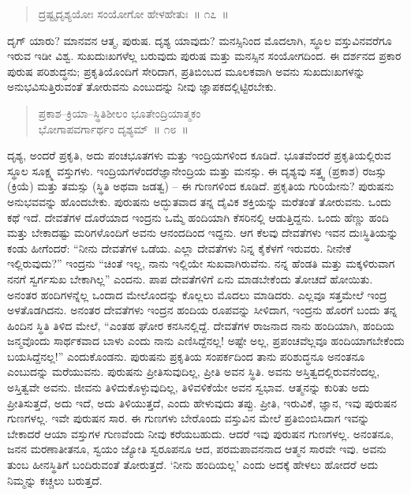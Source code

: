 \begin{verse}
ದ್ರಷ್ಟೃದೃಶ್ಯಯೋಃ ಸಂಯೋಗೋ ಹೇಳಹೇತುಃ~॥ ೧೭~॥
\end{verse}

\vspace{-0.4cm}


\vskip 0.2cm

ದೃಗ್​ ಯಾರು? ಮಾನವನ ಆತ್ಮ, ಪುರುಷ. ದೃಶ್ಯ ಯಾವುದು? ಮನಸ್ಸಿನಿಂದ ಮೊದಲಾಗಿ, ಸ್ಥೂಲ ವಸ್ತುವಿನವರೆಗೂ ಇರುವ ಇಡೀ ವಿಶ್ವ. ಸುಖದುಃಖಗಳೆಲ್ಲ ಬರುವುದು ಪುರುಷ ಮತ್ತು ಮನಸ್ಸಿನ ಸಂಯೋಗದಿಂದ. ಈ ದರ್ಶನದ ಪ್ರಕಾರ ಪುರುಷ ಪರಿಶುದ್ಧನು; ಪ್ರಕೃತಿಯೊಂದಿಗೆ ಸೇರಿದಾಗ, ಪ್ರತಿಬಿಂಬದ ಮೂಲಕವಾಗಿ ಅವನು ಸುಖದುಃಖಗಳನ್ನು ಅನುಭವಿಸುತ್ತಿರುವಂತೆ ತೋರುವನು ಎಂಬುದನ್ನು ನೀವು ಜ್ಞಾಪಕದಲ್ಲಿಟ್ಟಿರಬೇಕು. 

\vspace{-0.2cm}

\begin{verse}
ಪ್ರಕಾಶ–ಕ್ರಿಯಾ–ಸ್ಥಿತಿಶೀಲಂ ಭೂತೇಂದ್ರಿಯಾತ್ಮಕಂ\\ ಭೋಗಾಪವರ್ಗಾರ್ಥಂ ದೃಶ್ಯಮ್​~॥ ೧೮~॥
\end{verse}

\vspace{-0.4cm}


\vskip 0.2cm

ದೃಶ್ಯ, ಅಂದರೆ ಪ್ರಕೃತಿ, ಅದು ಪಂಚಭೂತಗಳು ಮತ್ತು ಇಂದ್ರಿಯಗಳಿಂದ ಕೂಡಿದೆ. ಭೂತವೆಂದರೆ ಪ್ರಕೃತಿಯಲ್ಲಿರುವ ಸ್ಥೂಲ ಸೂಕ್ಷ್ಮ ವಸ್ತುಗಳು. ಇಂದ್ರಿಯಗಳೆಂದರೆ\break ಜ್ಞಾನೇಂದ್ರಿಯ ಮತ್ತು ಮನಸ್ಸು. ಈ ದೃಶ್ಯವು ಸತ್ತ್ವ (ಪ್ರಕಾಶ) ರಜಸ್ಸು (ಕ್ರಿಯೆ) ಮತ್ತು ತಮಸ್ಸು (ಸ್ಥಿತಿ ಅಥವಾ ಜಡತ್ವ) – ಈ ಗುಣಗಳಿಂದ ಕೂಡಿದೆ. ಪ್ರಕೃತಿಯ ಗುರಿಯೇನು? ಪುರುಷನು ಅನುಭವವನ್ನು ಹೊಂದಬೇಕು. ಪುರುಷನು ಅದ್ಭುತವಾದ ತನ್ನ ದೈವಿಕ ಶಕ್ತಿಯನ್ನು ಮರೆತಂತೆ ತೋರುವನು. ಒಂದು ಕಥೆ ಇದೆ. ದೇವತೆಗಳ ದೊರೆಯಾದ ಇಂದ್ರನು ಒಮ್ಮೆ ಹಂದಿಯಾಗಿ ಕೆಸರಿನಲ್ಲಿ ಆಡುತ್ತಿದ್ದನು. ಒಂದು ಹೆಣ್ಣು ಹಂದಿ ಮತ್ತು ಬೇಕಾದಷ್ಟು ಮರಿಗಳೊಂದಿಗೆ ಅವನು ಆನಂದದಿಂದ ಇದ್ದನು. ಆಗ ಕೆಲವು ದೇವತೆಗಳು ಇವನ ದುಃಸ್ಥಿತಿಯನ್ನು ಕಂಡು ಹೀಗೆಂದರೆ: “ನೀನು ದೇವತೆಗಳ ಒಡೆಯ. ಎಲ್ಲಾ ದೇವತೆಗಳು ನಿನ್ನ ಕೈಕೆಳಗೆ ಇರುವರು. ನೀನೇಕೆ ಇಲ್ಲಿರುವುದು?” ಇಂದ್ರನು “ಚಿಂತೆ ಇಲ್ಲ, ನಾನು ಇಲ್ಲಿಯೇ ಸುಖ\break ವಾಗಿರುವೆನು. ನನ್ನ ಹೆಂಡತಿ ಮತ್ತು ಮಕ್ಕಳಿರುವಾಗ ನನಗೆ ಸ್ವರ್ಗಸುಖ ಬೇಕಾಗಿಲ್ಲ” ಎಂದನು. ಪಾಪ ದೇವತೆಗಳಿಗೆ ಏನು ಮಾಡಬೇಕೆಂದು ತೋಚದೆ ಹೋಯಿತು. ಅನಂತರ ಹಂದಿಗಳನ್ನೆಲ್ಲ ಒಂದಾದ ಮೇಲೊಂದನ್ನು ಕೊಲ್ಲಲು ಮೊದಲು ಮಾಡಿದರು. ಎಲ್ಲವೂ ಸತ್ತಮೇಲೆ ಇಂದ್ರ ಅಳತೊಡಗಿದನು. ಅನಂತರ ದೇವತೆಗಳು ಇಂದ್ರನ ಹಂದಿಯ ರೂಪವನ್ನು ಸೀಳಿದಾಗ, ಇಂದ್ರನು ಹೊರಗೆ ಬಂದು ತನ್ನ ಹಿಂದಿನ ಸ್ಥಿತಿ ತಿಳಿದ ಮೇಲೆ, “ಎಂತಹ ಘೋರ ಕನಸಿನಲ್ಲಿದ್ದೆ. ದೇವತೆಗಳ ರಾಜನಾದ ನಾನು ಹಂದಿಯಾಗಿ, ಹಂದಿಯ ಜನ್ಮವೊಂದು ಸಾರ್ಥಕವಾದ ಬಾಳು ಎಂದು ನಾನು ಎಣಿಸಿದ್ದೆನಲ್ಲ! ಅಷ್ಟೇ ಅಲ್ಲ, ಪ್ರಪಂಚವೆಲ್ಲವೂ ಹಂದಿಯಾಗಬೇಕೆಂದು ಬಯಸಿದ್ದೆನಲ್ಲ!” ಎಂದುಕೊಂಡನು. ಪುರುಷನು ಪ್ರಕೃತಿಯ ಸಂಪರ್ಕದಿಂದ ತಾನು ಪರಿಶುದ್ಧನೂ ಅನಂತನೂ ಎಂಬುದನ್ನು ಮರೆಯುವನು. ಪುರುಷನು ಪ್ರೀತಿಸುವುದಿಲ್ಲ, ಪ್ರೀತಿ ಅವನ ಸ್ಥಿತಿ. ಅವನು ಅಸ್ತಿತ್ವದಲ್ಲಿರುವನೆಂದಲ್ಲ, ಅಸ್ತಿತ್ವವೇ ಅವನು. ಜೀವನು ತಿಳಿದುಕೊಳ್ಳುವುದಿಲ್ಲ, ತಿಳಿವಳಿಕೆಯೇ ಅವನ ಸ್ವಭಾವ. ಆತ್ಮನನ್ನು ಕುರಿತು ಅದು ಪ್ರೀತಿಸುತ್ತದೆ, ಅದು ಇದೆ, ಅದು ತಿಳಿಯುತ್ತದೆ, ಎಂದು ಹೇಳುವುದು ತಪ್ಪು. ಪ್ರೀತಿ, ಇರುವಿಕೆ, ಜ್ಞಾನ, ಇವು ಪುರುಷನ ಗುಣಗಳಲ್ಲ. ಇವೇ ಪುರುಷನ ಸಾರ. ಈ ಗುಣಗಳು ಬೇರೊಂದು ವಸ್ತುವಿನ ಮೇಲೆ ಪ್ರತಿಬಿಂಬಿಸಿದಾಗ ಇವನ್ನು ಬೇಕಾದರೆ ಆಯಾ ವಸ್ತುಗಳ ಗುಣವೆಂದು ನೀವು ಕರೆಯಬಹುದು. ಆದರೆ ಇವು ಪುರುಷನ ಗುಣಗಳಲ್ಲ. ಅನಂತನೂ, ಜನನ ಮರಣಾತೀತನೂ, ಸ್ವಯಂ ಜ್ಯೋತಿ ಸ್ವರೂಪನೂ ಆದ, ಪರಮಪಾವನನಾದ ಆತ್ಮನ ಸಾರವೇ ಇವು. ಅವನು ತುಂಬ ಹೀನಸ್ಥಿತಿಗೆ ಬಂದಿರುವಂತೆ ತೋರುತ್ತದೆ. ‘ನೀನು ಹಂದಿಯಲ್ಲ’ ಎಂದು ಅದಕ್ಕೆ ಹೇಳಲು ಹೋದರೆ ಅದು ನಿಮ್ಮನ್ನು ಕಚ್ಚಲು ಬರುತ್ತದೆ. 

